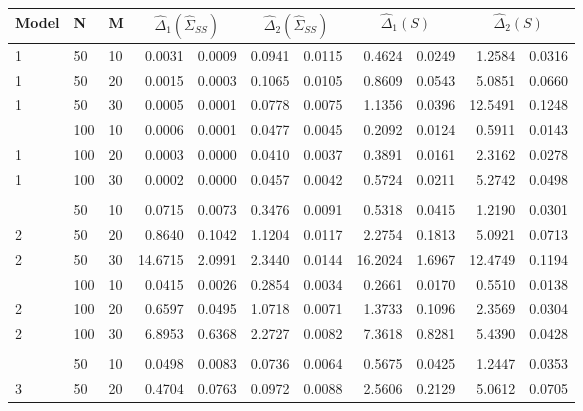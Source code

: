 \documentclass[12pt]{article}
\newcommand*\needsparaphrased{\color{red}}
\theoremstyle{definition}
\begin{document}
{\needsparaphrased{The following table will be formatted just as the one immediately before it if we decide to include it in the chapter.}}

\begin{table}[H] \label{table:ssanova-estimator-performance-with-se-loso}
\centering
\begin{tabular}{lllrrrrrrrr}
Model & N & M & \multicolumn{2}{c}{$\hat{\Delta}_1(\hat{\Sigma}_{SS})$} & \multicolumn{2}{c}{$\hat{\Delta}_2(\hat{\Sigma}_{SS})$} &  \multicolumn{2}{c}{$\hat{\Delta}_1(S)$} & \multicolumn{2}{c}{$\hat{\Delta}_2(S)$} \\ 
  \hline
1 & 50 & 10 & 0.0031 & 0.0009 & 0.0941 & 0.0115 & 0.4624 & 0.0249 & 1.2584 & 0.0316 \\ 
  1 & 50 & 20 & 0.0015 & 0.0003 & 0.1065 & 0.0105 & 0.8609 & 0.0543 & 5.0851 & 0.0660 \\ 
  1 & 50 & 30 & 0.0005 & 0.0001 & 0.0778 & 0.0075 & 1.1356 & 0.0396 & 12.5491 & 0.1248 \\
      \hdashline 
  1 & 100 & 10 & 0.0006 & 0.0001 & 0.0477 & 0.0045 & 0.2092 & 0.0124 & 0.5911 & 0.0143 \\ 
  1 & 100 & 20 & 0.0003 & 0.0000 & 0.0410 & 0.0037 & 0.3891 & 0.0161 & 2.3162 & 0.0278 \\ 
  1 & 100 & 30 & 0.0002 & 0.0000 & 0.0457 & 0.0042 & 0.5724 & 0.0211 & 5.2742 & 0.0498 \\ 
        \hdashline \\
      \hdashline
  2 & 50 & 10 & 0.0715 & 0.0073 & 0.3476 & 0.0091 & 0.5318 & 0.0415 & 1.2190 & 0.0301 \\ 
  2 & 50 & 20 & 0.8640 & 0.1042 & 1.1204 & 0.0117 & 2.2754 & 0.1813 & 5.0921 & 0.0713 \\ 
  2 & 50 & 30 & 14.6715 & 2.0991 & 2.3440 & 0.0144 & 16.2024 & 1.6967 & 12.4749 & 0.1194 \\ 
      \hdashline
  2 & 100 & 10 & 0.0415 & 0.0026 & 0.2854 & 0.0034 & 0.2661 & 0.0170 & 0.5510 & 0.0138 \\ 
  2 & 100 & 20 & 0.6597 & 0.0495 & 1.0718 & 0.0071 & 1.3733 & 0.1096 & 2.3569 & 0.0304 \\ 
  2 & 100 & 30 & 6.8953 & 0.6368 & 2.2727 & 0.0082 & 7.3618 & 0.8281 & 5.4390 & 0.0428 \\ 
       \hdashline \\
      \hdashline
  3 & 50 & 10 & 0.0498 & 0.0083 & 0.0736 & 0.0064 & 0.5675 & 0.0425 & 1.2447 & 0.0353 \\ 
  3 & 50 & 20 & 0.4704 & 0.0763 & 0.0972 & 0.0088 & 2.5606 & 0.2129 & 5.0612 & 0.0705 \\ 

\end{tabular}
\end{table}
\end{document}
